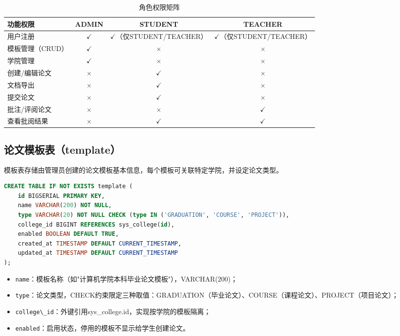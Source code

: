 \documentclass{../../softeng}
\begin{document}
\begin{table}[htbp]
    \centering
    \caption{角色权限矩阵}
    \label{tab:role_auth}
    \begin{tabular}{|l|c|c|c|}
        \hline
        \textbf{功能权限} & \textbf{ADMIN} & \textbf{STUDENT} & \textbf{TEACHER} \\
        \hline
        用户注册 & $\checkmark$ & $\checkmark$（仅STUDENT/TEACHER） & $\checkmark$（仅STUDENT/TEACHER） \\
        \hline
        模板管理（CRUD） & $\checkmark$ & $\times$ & $\times$ \\
        \hline
        学院管理 & $\checkmark$ & $\times$ & $\times$ \\
        \hline
        创建/编辑论文 & $\times$ & $\checkmark$ & $\times$ \\
        \hline
        文档导出 & $\times$ & $\checkmark$ & $\times$ \\
        \hline
        提交论文 & $\times$ & $\checkmark$ & $\times$ \\
        \hline
        批注/评阅论文 & $\times$ & $\times$ & $\checkmark$ \\
        \hline
        查看批阅结果 & $\times$ & $\checkmark$ & $\checkmark$ \\
        \hline
    \end{tabular}
\end{table}

\subsection{论文模板表（template）}

模板表存储由管理员创建的论文模板基本信息，每个模板可关联特定学院，并设定论文类型。

\begin{lstlisting}[language=SQL,caption={template 建表语句}]
CREATE TABLE IF NOT EXISTS template (
    id BIGSERIAL PRIMARY KEY,
    name VARCHAR(200) NOT NULL,
    type VARCHAR(20) NOT NULL CHECK (type IN ('GRADUATION', 'COURSE', 'PROJECT')),
    college_id BIGINT REFERENCES sys_college(id),
    enabled BOOLEAN DEFAULT TRUE,
    created_at TIMESTAMP DEFAULT CURRENT_TIMESTAMP,
    updated_at TIMESTAMP DEFAULT CURRENT_TIMESTAMP
);
\end{lstlisting}

\begin{itemize}
    \item \verb|name|：模板名称（如"计算机学院本科毕业论文模板"），VARCHAR(200)；
    \item \verb|type|：论文类型，CHECK约束限定三种取值：GRADUATION（毕业论文）、COURSE（课程论文）、PROJECT（项目论文）；
    \item \verb|college\_id|：外键引用sys\_college.id，实现按学院的模板隔离；
    \item \verb|enabled|：启用状态，停用的模板不显示给学生创建论文。
\end{itemize}
\end{document}
